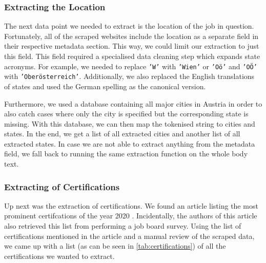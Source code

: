 \documentclass[runningheads]{llncs}
\begin{document}
\subsubsection{Extracting the Location}
\label{subsub:extracting_the_location}

The next data point we needed to extract is the location of the job in question. Fortunately, all of the scraped websites include the location as a separate field in their respective metadata section. This way, we could limit our extraction to just this field. This field required a specialised data cleaning step which expands state acronyms. For example, we needed to replace \texttt{'W'} with \texttt{'Wien'} or \texttt{'Oö'} and \texttt{'OÖ'} with \texttt{'Oberösterreich'}. Additionally, we also replaced the English translations of states and used the German spelling as the canonical version.

Furthermore, we used a database containing all major cities in Austria \cite{austria_cities_database} in order to also catch cases where only the city is specified but the corresponding state is missing. With this database, we can then map the tokenised string to cities and states. In the end, we get a list of all extracted cities and another list of all extracted states. In case we are not able to extract anything from the metadata field, we fall back to running the same extraction function on the whole body text.

\subsubsection{Extracting of Certifications}
\label{subsub:extracting_of_certifications}

Up next was the extraction of certifications. We found an article listing the most prominent certifcations of the year 2020 \cite{certifications}. Incidentally, the authors of this article also retrieved this list from performing a job board survey. Using the list of certifications mentioned in the article and a manual review of the scraped data, we came up with a list (as can be seen in \autoref{tab:certifications}) of all the certifications we wanted to extract.
\end{document}
